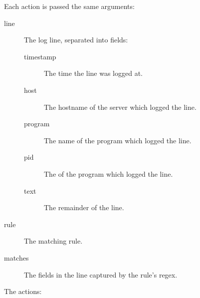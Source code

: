\documentclass[a4paper,12pt,draft]{article}
\begin{document}
Each action is passed the same arguments: 

\begin{description}

    \item [line] The log line, separated into fields:

        \begin{description}

            \item [timestamp] The time the line was logged at.

            \item [host] The hostname of the server which logged the line.

            \item [program] The name of the program which logged the line.

            \item [pid] The \pid{} of the program which logged the line.

            \item [text] The remainder of the line.

        \end{description}

    \item [rule] The matching rule.

    \item [matches] The fields in the line captured by the rule's regex.

\end{description}

The actions:
\end{document}
